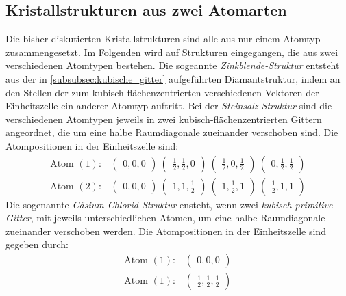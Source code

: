 \subsection{Kristallstrukturen aus zwei Atomarten}
\label{subsec:2atome}
Die bisher diskutierten Kristallstrukturen sind alle aus nur
einem Atomtyp zusammengesetzt. Im Folgenden wird auf Strukturen
eingegangen, die aus zwei verschiedenen Atomtypen bestehen.
Die sogeannte \textit{Zinkblende-Struktur} entsteht aus der
in \ref{subsubsec:kubische_gitter}
aufgeführten Diamantstruktur, indem an den Stellen der zum
kubisch-flächenzentrierten verschiedenen Vektoren der Einheitszelle
ein anderer Atomtyp auftritt.
Bei der \textit{Steinsalz-Struktur}
sind die verschiedenen Atomtypen
jeweils in zwei kubisch-flächenzentrierten Gittern angeordnet, die um eine
halbe Raumdiagonale zueinander verschoben sind. Die Atompositionen
in der Einheitszelle sind:
\begin{align}
  \label{eqn:5*}
  \text{Atom }(1) :&
  \begin{pmatrix}
    0, 0, 0
  \end{pmatrix}\
  \begin{pmatrix}
    \frac{1}{2}, \frac{1}{2}, 0
  \end{pmatrix}\
  \begin{pmatrix}
    \frac{1}{2}, 0, \frac{1}{2}
  \end{pmatrix}\
  \begin{pmatrix}
    0, \frac{1}{2}, \frac{1}{2}
  \end{pmatrix}\\
  \label{eqn:6*}
  \text{Atom }(2) :&
  \begin{pmatrix}
    0, 0, 0
  \end{pmatrix}\
  \begin{pmatrix}
    1, 1, \frac{1}{2}
  \end{pmatrix}\
  \begin{pmatrix}
    1, \frac{1}{2}, 1
  \end{pmatrix}\
  \begin{pmatrix}
    \frac{1}{2}, 1, 1
   \end{pmatrix}
\end{align}
Die sogenannte \textit{Cäsium-Chlorid-Struktur}
ensteht, wenn zwei \textit{kubisch-primitive Gitter}, mit jeweils
unterschiedlichen Atomen, um eine halbe Raumdiagonale zueinander
verschoben werden. Die Atompositionen in der Einheitszelle
sind gegeben durch:
\begin{align}
  \label{eqn:7*}
  \text{Atom }(1) :&
  \begin{pmatrix}
    0, 0, 0
  \end{pmatrix}\\
  \label{eqn:8*}
  \text{Atom }(1) :&
  \begin{pmatrix}
    \frac{1}{2}, \frac{1}{2}, \frac{1}{2}
  \end{pmatrix}
\end{align}
